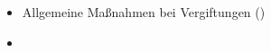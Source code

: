 \label{m:intoxikation-alkohol}
\begin{itemize}
    \item Allgemeine Maßnahmen bei Vergiftungen
    ()
    \item \TxBeiVit \TxMassVitMK
\end{itemize}